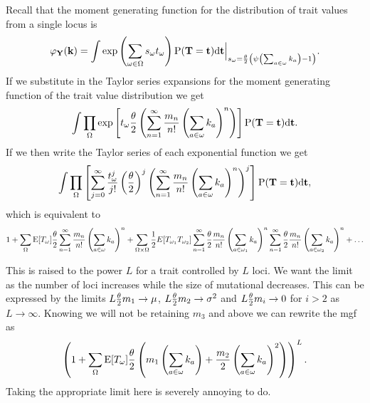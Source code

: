 Recall that the moment generating function for the distribution of trait values
from a single locus is
\begin{equation*}
  \varphi_{\mathbf{Y}}(\mathbf{k}) = \int \exp \left( \sum_{\omega \in \Omega} s_{\omega}t_{\omega} \right)
  \mathrm{P}(\mathbf{T}=\mathbf{t})\mathrm{d}\mathbf{t}
  \Bigr|_{s_{\omega}=\frac{\theta}{2} \left( \psi\left(\sum_{a \in \omega}k_{a}\right) -1 \right)}.
\end{equation*}
If we substitute in the Taylor series expansions for the moment generating
function of the trait value distribution we get
\begin{equation*}
  \int \prod_{\Omega} \exp\left[ t_{\omega} \frac{\theta}{2} \left( \sum_{n=1}^{\infty} \frac{m_n}{n!}
    \left( \sum_{a \in \omega} k_a \right)^n \right) \right]
  \mathrm{P}(\mathbf{T} = \mathbf{t}) \mathrm{d}\mathbf{t}.
\end{equation*}
If we then write the Taylor series of each exponential function we get
\begin{equation*}
  \int \prod_{\Omega} \left[ \sum_{j=0}^\infty \frac{t_{\omega}^j}{j!}
  \left( \frac{\theta}{2} \right)^j \left( \sum_{n=1}^{\infty} \frac{m_n}{n!}
  \left( \sum_{a \in \omega} k_a \right)^n \right)^j \right]
  \mathrm{P}(\mathbf{T} = \mathbf{t}) \mathrm{d}\mathbf{t},
\end{equation*}
which is equivalent to
\begin{equation*}
  1 + \sum_{\Omega} \mathrm{E}[T_\omega] \frac{\theta}{2} \sum_{n=1}^{\infty} \frac{m_n}{n!} \left(
  \sum_{a \in \omega} k_a \right)^n +
  \sum_{\Omega \times \Omega} \frac{1}{2} E[T_{\omega_1}T_{\omega_2}]
  \sum_{n=1}^{\infty} \frac{\theta}{2} \frac{m_n}{n!} \left(\sum_{a \in \omega_1} k_a \right)^n
  \sum_{n=1}^{\infty} \frac{\theta}{2} \frac{m_n}{n!} \left(\sum_{a \in \omega_2} k_a \right)^n + \ldots
\end{equation*}

This is raised to the power $L$ for a trait controlled by $L$ loci. We want the
limit as the number of loci increases while the size of mutational decreases.
This can be expressed by the limits $L \frac{\theta}{2} m_1 \to \mu$, $L \frac{\theta}{2} m_2\to \sigma^2$
and $L \frac{\theta}{2} m_i\to 0$ for $i>2$ as $L \to \infty$. Knowing we will not be
retaining $m_3$ and above we can rewrite the mgf as
\begin{equation*}
  \left(1 + \sum_{\Omega} \mathrm{E}[T_\omega] \frac{\theta}{2} \left(m_1 \left(\sum_{a \in \omega} k_a \right) +
  \frac{m_2}{2} \left(\sum_{a \in \omega} k_a \right)^2\right)\right)^L.
\end{equation*}
Taking the appropriate limit here is severely annoying to do. 

